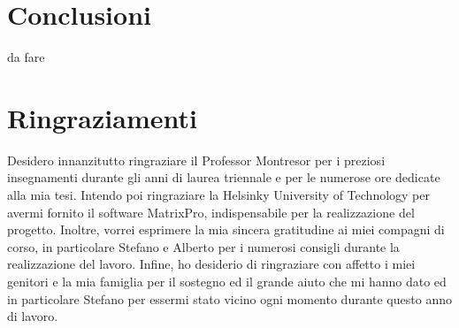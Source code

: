 \section{Conclusioni}

da fare


\section{Ringraziamenti}

Desidero innanzitutto ringraziare il Professor Montresor per i preziosi
insegnamenti durante gli anni di laurea triennale e per le numerose
ore dedicate alla mia tesi. Intendo poi ringraziare la Helsinky University
of Technology per avermi fornito il software MatrixPro, indispensabile
per la realizzazione del progetto. Inoltre, vorrei esprimere la mia
sincera gratitudine ai miei compagni di corso, in particolare Stefano
e Alberto per i numerosi consigli durante la realizzazione del lavoro.
Infine, ho desiderio di ringraziare con affetto i miei genitori e
la mia famiglia per il sostegno ed il grande aiuto che mi hanno dato
ed in particolare Stefano per essermi stato vicino ogni momento durante
questo anno di lavoro.